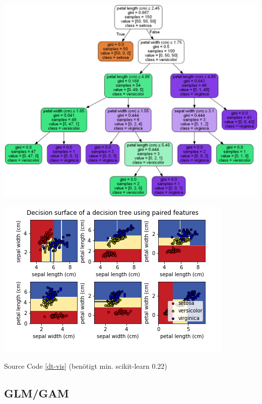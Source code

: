 \documentclass[
  12pt, %
  a4paper, %
  oneside, %
  openany, 
  numbers=noenddot, %
  BCOR=5mm, %
  parskip=half*, %
  thesis, %
]{bfhbook}
\begin{document}
\begin{center}
\begin{minipage}[t]{0.45\linewidth}
\centering
	\includegraphics[width=\textwidth]{Bilder/iris-dt-explained.png}
\end{minipage}\hfill
\begin{minipage}[t]{0.45\linewidth}
\centering
	\includegraphics[width=\textwidth]{Bilder/iris-dt-decision-surface.png}
\end{minipage}
\end{center}
Source Code \ref{dt-vis} (benötigt min. scikit-learn 0.22)

\subsection{GLM/GAM}
\end{document}
